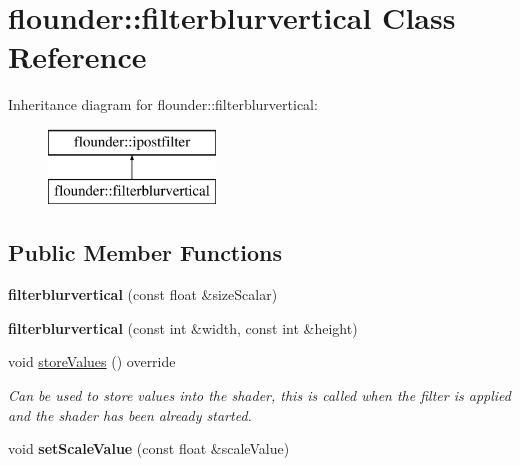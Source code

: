 \hypertarget{classflounder_1_1filterblurvertical}{}\section{flounder\+:\+:filterblurvertical Class Reference}
\label{classflounder_1_1filterblurvertical}
Inheritance diagram for flounder\+:\+:filterblurvertical\+:\begin{figure}[H]
\begin{center}
\leavevmode
\includegraphics[height=2.000000cm]{classflounder_1_1filterblurvertical}
\end{center}
\end{figure}
\subsection*{Public Member Functions}
\begin{DoxyCompactItemize}
\item 
\mbox{\label{classflounder_1_1filterblurvertical_a4762c1d32016cc81dfb67a001308f5a2}} 
{\bfseries filterblurvertical} (const float \&size\+Scalar)
\item 
\mbox{\label{classflounder_1_1filterblurvertical_ad3399e213b743f1dbc44b1254363feb5}} 
{\bfseries filterblurvertical} (const int \&width, const int \&height)
\item 
void \hyperlink{classflounder_1_1filterblurvertical_acdc191b6c9b067c9619055c1672dd2e5}{store\+Values} () override
\begin{DoxyCompactList}\small\item\em Can be used to store values into the shader, this is called when the filter is applied and the shader has been already started. \end{DoxyCompactList}\item 
\mbox{\label{classflounder_1_1filterblurvertical_a4640c8ef21b48d8f8e853d8d92232d78}} 
void {\bfseries set\+Scale\+Value} (const float \&scale\+Value)
\end{DoxyCompactItemize}
